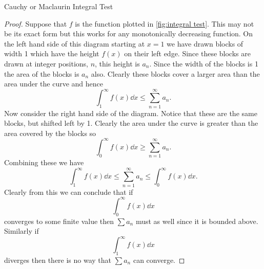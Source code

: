\documentclass[fleqn]{NotesClass}
\begin{document}
\begin{lma}{Cauchy or Maclaurin Integral Test}{}
\begin{proof}
            Suppose that \(f\) is the function plotted in \cref{fig:integral test}.
            This may not be its exact form but this works for any monotonically decreasing function.
            On the left hand side of this diagram starting at \(x = 1\) we have drawn blocks of width 1 which have the height \(f(x)\) on their left edge.
            Since these blocks are drawn at integer positions, \(n\), this height is \(a_n\).
            Since the width of the blocks is 1 the area of the blocks is \(a_n\) also.
            Clearly these blocks cover a larger area than the area under the curve and hence
            \begin{equation}
                \int_{1}^{\infty} f(x) \dd{x} \le \sum_{n=1}^{\infty} a_n.
            \end{equation}
            Now consider the right hand side of the diagram.
            Notice that these are the same blocks, but shifted left by 1.
            Clearly the area under the curve is greater than the area covered by the blocks so
            \begin{equation}
                \int_{0}^{\infty} f(x) \dd{x} \ge \sum_{n=1}^{\infty} a_n.
            \end{equation}
            Combining these we have
            \begin{equation}
                \int_{1}^{\infty} f(x) \dd{x} \le \sum_{n=1}^{\infty} a_n \le \int_{0}^{\infty} f(x) \dd{x}.
            \end{equation}
            Clearly from this we can conclude that if 
            \begin{equation}
                \int_{0}^{\infty} f(x) \dd{x}
            \end{equation}
            converges to some finite value then \(\sum a_n\) must as well since it is bounded above.
            Similarly if
            \begin{equation}
                \int_1^\infty f(x)\dd{x}
            \end{equation}
            diverges then there is no way that \(\sum a_n\) can converge.
        \end{proof}
    \end{lma}
    
\end{document}
